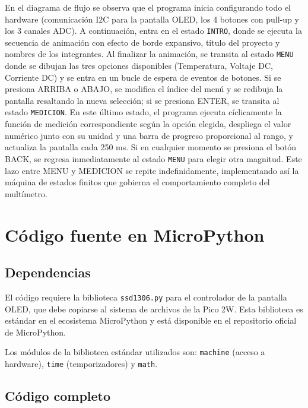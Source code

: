 \documentclass[letterpaper,12pt]{article}
\begin{document}
    En el diagrama de flujo se observa que el programa inicia configurando todo el hardware (comunicación I2C para la pantalla OLED, los 4 botones con pull-up y los 3 canales ADC). A continuación, entra en el estado \texttt{INTRO}, donde se ejecuta la secuencia de animación con efecto de borde expansivo, título del proyecto y nombres de los integrantes. Al finalizar la animación, se transita al estado \texttt{MENU} donde se dibujan las tres opciones disponibles (Temperatura, Voltaje DC, Corriente DC) y se entra en un bucle de espera de eventos de botones. Si se presiona ARRIBA o ABAJO, se modifica el índice del menú y se redibuja la pantalla resaltando la nueva selección; si se presiona ENTER, se transita al estado \texttt{MEDICION}. En este último estado, el programa ejecuta cíclicamente la función de medición correspondiente según la opción elegida, despliega el valor numérico junto con su unidad y una barra de progreso proporcional al rango, y actualiza la pantalla cada 250 ms. Si en cualquier momento se presiona el botón BACK, se regresa inmediatamente al estado \texttt{MENU} para elegir otra magnitud. Este lazo entre MENU y MEDICION se repite indefinidamente, implementando así la máquina de estados finitos que gobierna el comportamiento completo del multímetro.

    \section{Código fuente en MicroPython}


    \subsection{Dependencias}

    El código requiere la biblioteca \texttt{ssd1306.py} para el controlador de la pantalla OLED, que debe copiarse al sistema de archivos de la Pico 2W. Esta biblioteca es estándar en el ecosistema MicroPython y está disponible en el repositorio oficial de MicroPython.

    Los módulos de la biblioteca estándar utilizados son: \texttt{machine} (acceso a hardware), \texttt{time} (temporizadores) y \texttt{math}.

    \subsection{Código completo}
\end{document}
